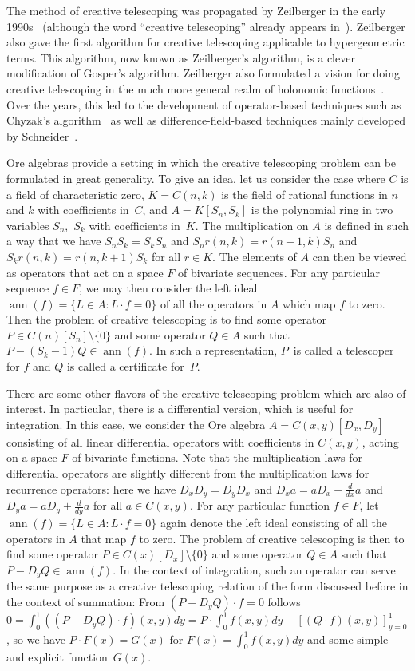 \documentclass[a4paper,draft]{amsart}
\begin{document}
 The method of creative telescoping was propagated by Zeilberger in the early
 1990s~\cite{wilf90,wilf92a,zeilberger91,petkovsek97}  (although the word ``creative telescoping'' already appears
 in~\cite{vanDerPoorten79}).  Zeilberger also gave the first algorithm for creative
 telescoping applicable to hypergeometric terms. This algorithm, now known as
 Zeilberger's algorithm, is a clever modification of Gosper's algorithm.
 Zeilberger also formulated a vision for doing creative telescoping in the much more
 general realm of holonomic functions~\cite{zeilberger90}. Over the years, this led to the
 development of operator-based techniques such as Chyzak's algorithm~\cite{chyzak98a,chyzak00}
 as well as difference-field-based techniques mainly developed by
 Schneider~\cite{schneider01,schneider08,schneider13b}.


 \def\ann{\operatorname{ann}}%
 Ore algebras provide a setting in which the creative telescoping problem can be formulated
 in great generality. To give an idea, let us consider the case where $C$ is a field of
 characteristic zero,
 $K=C(n,k)$ is the field of rational functions in $n$ and $k$ with coefficients in~$C$, and
 $A=K[S_n,S_k]$ is the polynomial ring in two variables $S_n$,~$S_k$ with coefficients in~$K$.
 The multiplication on $A$ is defined in such a way that we have
 $S_nS_k = S_kS_n$ and
 $S_n r(n,k)=r(n+1,k)S_n$ and
 $S_k r(n,k)=r(n,k+1)S_k$ for all $r\in K$.
 The elements of $A$ can then be viewed as operators that act on a space $F$ of bivariate sequences.
 For any particular sequence $f\in F$, we may then consider the left ideal $\ann(f)=\{L\in A:L\cdot f=0\}$
 of all the operators in $A$ which map $f$ to zero. Then the problem of creative telescoping is
 to find some operator $P\in C(n)[S_n]\setminus\{0\}$ and some operator $Q\in A$ such that $P-(S_k-1)Q\in\ann(f)$.
 In such a representation, $P$~is called a telescoper for $f$ and $Q$ is called a certificate for~$P$.

 There are some other flavors of the creative telescoping problem which are also of interest.
 In particular, there is a differential version, which is useful for integration. In this case,
 we consider the Ore algebra $A=C(x,y)[D_x,D_y]$ consisting of all linear differential operators
 with coefficients in $C(x,y)$, acting on a space $F$ of bivariate functions.
 Note that the multiplication laws for differential operators are slightly different from the multiplication
 laws for recurrence operators: here we have $D_xD_y=D_yD_x$ and $D_xa=aD_x + \frac d{dx}a$ and $D_ya=aD_y+\frac d{dy}a$
 for all $a\in C(x,y)$.
 For any particular function $f\in F$, let $\ann(f)=\{L\in A:L\cdot f=0\}$ again denote the left ideal
 consisting of all the operators in $A$ that map $f$ to zero. The problem of creative telescoping is then
 to find some operator $P\in C(x)[D_x]\setminus\{0\}$ and some operator $Q\in A$ such that $P-D_yQ\in\ann(f)$.
 In the context of integration, such an operator can serve the same purpose as a creative telescoping relation
 of the form discussed before in the context of summation:
 From $(P-D_yQ)\cdot f=0$ follows $0=\int_0^1((P-D_yQ)\cdot f)(x,y)dy=P\cdot\int_0^1 f(x,y)dy-[(Q\cdot f)(x,y)]_{y=0}^{1}$,
 so we have $P\cdot F(x)=G(x)$ for $F(x)=\int_0^1 f(x,y)dy$ and some simple and explicit function~$G(x)$.
\end{document}
